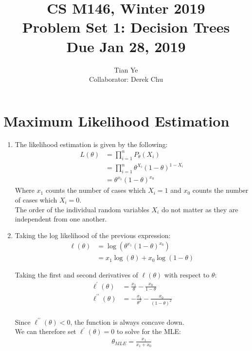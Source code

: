 \documentclass[11pt]{article}
\newcommand{\cnum}{CS M146}
\newcommand{\ced}{Winter 2019}
\newcommand{\ctitle}[3]{\title{\vspace{-0.5in}\cnum, \ced\\Problem Set #1: #2\\Due #3}}
\newcommand{\solution}[1]{{{\color{blue}{\bf Solution:} {#1}}}}
\begin{document}
\ctitle{1}{Decision Trees}{Jan 28, 2019}
\author{Tian Ye \\ \small{Collaborator: Derek Chu}}
\maketitle

\newpage

\section{Maximum Likelihood Estimation}
\begin{enumerate}
\item 

\solution{
The likelihood estimation is given by the following:
\begin{align}
L(\theta) &= \prod_{i=1}^{n} P_{\theta}(X_{i}) \\
	     &= \prod_{i=1}^{n} \theta^{X_{i}}(1-\theta)^{1-X_{i}} \\
	     &= \theta^{x_{1}}(1-\theta)^{x_{0}}
\end{align}
Where $x_{1}$ counts the number of cases which $X_{i} = 1$ and  $x_{0}$ counts the number of cases which $X_{i} = 0$. \\
The order of the individual random variables $X_{i}$ do not matter as they are independent from one another.
}

\vspace{1cm}

\item
\solution{
Taking the log likelihood of the previous expression:
\begin{align}
\ell(\theta) &= \log(\theta^{x_{1}}(1-\theta)^{x_{0}}) \\
                  &= x_{1}\log(\theta) + x_{0}\log(1-\theta)
\end{align}

Taking the first and second derivatives of $\ell(\theta)$ with respect to $\theta$:
\begin{align}
\ell^{\prime}(\theta) &= \frac{x_{1}}{\theta} - \frac{x_{0}}{1-\theta}\\
\ell^{\prime\prime}(\theta) &= -\frac{x_{1}}{\theta^2} - \frac{x_{0}}{(1-\theta)^2}\\
\end{align}

Since $\ell^{\prime\prime}(\theta) < 0$, the function is always concave down. \\
We can therefore set $\ell^{\prime}(\theta) = 0$ to solve for the MLE:
\begin{align}
\theta_{MLE} = \frac{x_1}{x_{1}+x_0}
\end{align}
}
\newpage



\end{enumerate}
\end{document}
